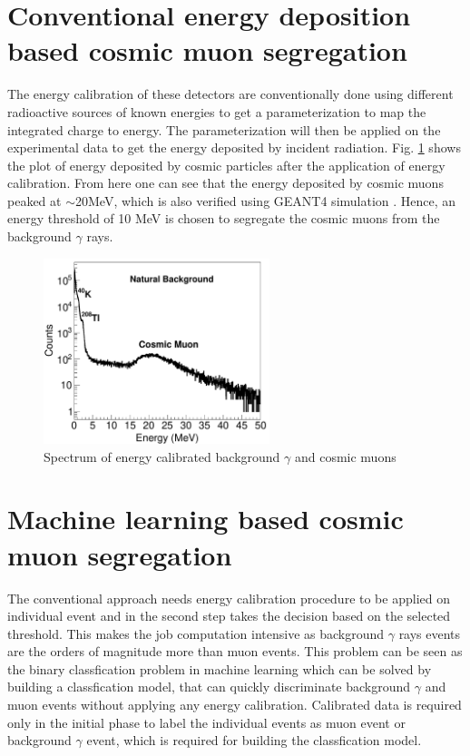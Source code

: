 \documentclass[twocolumn,amsmath,amssymb]{snp}
\begin{document}
\section*{Conventional energy deposition based cosmic muon segregation}
The energy calibration of these detectors are conventionally done using different radioactive sources of known energies to get a parameterization to map the integrated charge to energy. The parameterization will then be applied on the experimental data to get the energy deposited by incident radiation. Fig. \ref{calib} shows the plot of energy deposited by cosmic particles after the application of energy calibration. From here one can see that the energy deposited by cosmic muons peaked at $\sim$20MeV, which is also verified using GEANT4 simulation \cite{mypaper}. Hence, an energy threshold of 10 MeV is chosen to segregate the cosmic muons from the background $\gamma$ rays.
\begin{figure}
\includegraphics[width=66mm]{calibrated.pdf}%
\caption{\label{calib} Spectrum of energy calibrated background $\gamma$ and cosmic muons}
\end{figure}

\section*{Machine learning based cosmic muon segregation}
The conventional approach needs energy calibration procedure to be applied on individual event and in the second step takes the decision based on the selected threshold. This makes the job computation intensive as background $\gamma$ rays events are the orders of magnitude more than muon events. This problem can be seen as the binary classfication problem in machine learning which can be solved by building a classfication model, that can quickly discriminate background $\gamma$ and muon events without applying any energy calibration. Calibrated data is required only in the initial phase to label the individual events as muon event or background $\gamma$ event, which is required for building the classfication model.
\end{document}
